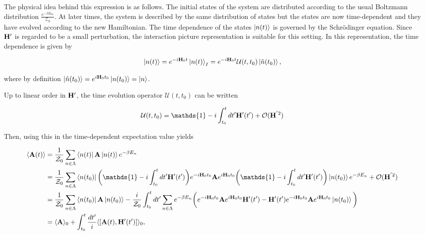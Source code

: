\documentclass{homework}
\begin{document}
The physical idea behind this expression is as follows. The initial states of the system are distributed according to the usual Boltzmann distribution $\frac{e^{-\beta E_{0n}}}{\mathcal{Z_0}}$. At later times, the system is described by the same distribution of states but the states are now time-dependent and they have evolved according to the new Hamiltonian. The time dependence of the states $\ket{n(t)}$ is governed by the Schr\"odinger equation. Since ${\bf H}'$ is regarded to be a small perturbation, the interaction picture representation is suitable for this setting. In this representation, the time dependence is given by 

\begin{equation}
    \ket{n(t)} = e^{-i{\bf H}_0 t} \ket{n(t)}_I = e^{-i{\bf H}_0 t} \mathcal{U}(t, t_0) \ket{\hat{n}(t_0)},
\end{equation}

where by definition $\ket{\hat{n}(t_0)} = e^{i {\bf H}_0 t_0} \ket{n(t_0)} = \ket{n}$.

Up to linear order in ${\bf H}'$, the time evolution operator $\mathcal{U}(t, t_0)$ can be written 

$$
    \mathcal{U}(t, t_0) = \mathds{1} - i \int_{t_0}^t dt' \Hamiltonian'(t') + \mathcal{O}(\Hamiltonian^{'2})
$$

Then, using this in the time-dependent expectation value yields 

\begin{equation} \begin{split}
    \langle {\bf A}(t) \rangle &= \frac{1}{\mathcal{Z}_0} \sum_{n \in \Lambda} \bra{n(t)} {{\bf A}} \ket{n(t)} e^{-\beta E_n} \\
    &= \frac{1}{\mathcal{Z}_0} \sum_{n \in \Lambda} \bra{n(t_0)} \bigg(\mathds{1} - i \int_{t_0}^t dt' \Hamiltonian'(t')\bigg) e^{-i \Hamiltonian_0 t_0} {{\bf A}} e^{i \Hamiltonian_0 t_0} \bigg(\mathds{1} - i \int_{t_0}^t dt' \Hamiltonian'(t')\bigg) \ket{n(t_0)}  e^{-\beta E_n}+ \mathcal{O}(\Hamiltonian^{'2}) \\
    &= \frac{1}{\mathcal{Z}_0} \sum_{n \in \Lambda} \bra{n(t_0)} {{\bf A}} \ket{n(t_0)} - \frac{i}{\mathcal{Z}_0} \int_{t_0}^{t} dt' \sum_{n \in \Lambda} e^{-\beta E_n} \bigg( e^{-i \Hamiltonian_0 t_0} {{\bf A}} e^{i \Hamiltonian_0 t_0} \Hamiltonian'(t') - \Hamiltonian'(t')e^{-i \Hamiltonian_0 t_0} {{\bf A}} e^{i \Hamiltonian_0 t_0} \ket{n(t_0)} \bigg) \\
    &= \langle {{\bf A}} \rangle_{0} + \int_{t_0}^{t} \frac{dt'}{i} \langle[{{\bf A}}(t), \Hamiltonian'(t')]\rangle_{0},
\end{split}
\end{equation}
\end{document}
